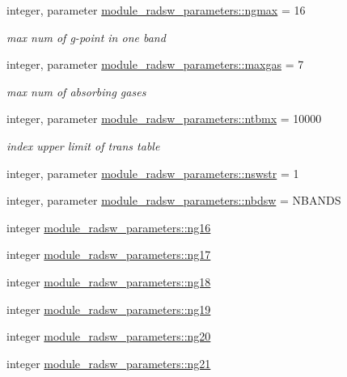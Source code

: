 \begin{DoxyCompactItemize}
integer, parameter \hyperlink{namespacemodule__radsw__parameters_a0ba0ff5c18d3303a852d88687b4b5ca9}{module\+\_\+radsw\+\_\+parameters\+::ngmax} = 16
\begin{DoxyCompactList}\small\item\em max num of g-\/point in one band \end{DoxyCompactList}\item 
integer, parameter \hyperlink{namespacemodule__radsw__parameters_a5bc6fbb4231281a604352eec6b8e2bfc}{module\+\_\+radsw\+\_\+parameters\+::maxgas} = 7
\begin{DoxyCompactList}\small\item\em max num of absorbing gases \end{DoxyCompactList}\item 
integer, parameter \hyperlink{namespacemodule__radsw__parameters_a4bd72558be40bfccfb78c48e640acd07}{module\+\_\+radsw\+\_\+parameters\+::ntbmx} = 10000
\begin{DoxyCompactList}\small\item\em index upper limit of trans table \end{DoxyCompactList}\item 
integer, parameter \hyperlink{namespacemodule__radsw__parameters_a3d4238ce9a40d70a6cdfe241d640ff5f}{module\+\_\+radsw\+\_\+parameters\+::nswstr} = 1
\item 
integer, parameter \hyperlink{namespacemodule__radsw__parameters_ab1e121fde29dde00871e4a7d43be1ddb}{module\+\_\+radsw\+\_\+parameters\+::nbdsw} = N\+B\+A\+N\+DS
\item 
integer \hyperlink{namespacemodule__radsw__parameters_a442b3758f00a388cd8b7129ba910942a}{module\+\_\+radsw\+\_\+parameters\+::ng16}
\item 
integer \hyperlink{namespacemodule__radsw__parameters_af1f90ffe5780463d1e2edbe0e8dfd1f9}{module\+\_\+radsw\+\_\+parameters\+::ng17}
\item 
integer \hyperlink{namespacemodule__radsw__parameters_ac00a8e59e4f7e584af9b453c2c9fe35d}{module\+\_\+radsw\+\_\+parameters\+::ng18}
\item 
integer \hyperlink{namespacemodule__radsw__parameters_ab3551e23105cd3515e887e877407dc39}{module\+\_\+radsw\+\_\+parameters\+::ng19}
\item 
integer \hyperlink{namespacemodule__radsw__parameters_a1619a2243f1cb29e4393598fa0bc4c8f}{module\+\_\+radsw\+\_\+parameters\+::ng20}
\item 
integer \hyperlink{namespacemodule__radsw__parameters_ab029caf0ee0c1195539643bef00e0598}{module\+\_\+radsw\+\_\+parameters\+::ng21}

\end{DoxyCompactItemize}
